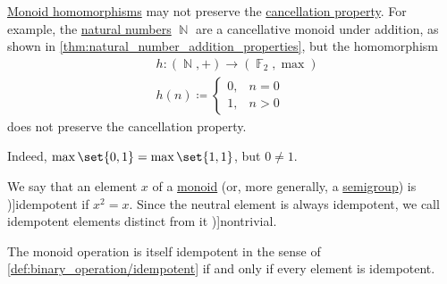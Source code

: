 \begin{example}\label{ex:monoid_cancellation_not_preserved_by_homomorphism}
  \hyperref[def:monoid/morphism]{Monoid homomorphisms} may not preserve the \hyperref[def:binary_operation/cancellative]{cancellation property}. For example, the \hyperref[def:natural_numbers]{natural numbers} \( \BbbN \) are a cancellative monoid under addition, as shown in \cref{thm:natural_number_addition_properties}, but the homomorphism
  \begin{equation*}
    \begin{aligned}
      &h: (\BbbN, +) \to (\BbbF_2, \max) \\
      &h(n) \coloneqq \begin{cases}
        0, &n = 0 \\
        1, &n > 0
      \end{cases}
    \end{aligned}
  \end{equation*}
  does not preserve the cancellation property.

  Indeed, \( \max\set{ 0, 1 } = \max\set{ 1, 1 } \), but \( 0 \neq 1 \).
\end{example}

\begin{definition}\label{def:monoid_idempotent}
  We say that an element \( x \) of a \hyperref[def:monoid]{monoid} (or, more generally, a \hyperref[def:semigroup]{semigroup}) is \term[ru=идемпотент (\cite[72]{Ляпин1960Полугруппы})]{idempotent} if \( x^2 = x \). Since the neutral element is always idempotent, we call idempotent elements distinct from it \term[en=nontrivial (idempotent) (\cite[287]{Rudin1991FunctionalAnalysis})]{nontrivial}.
\end{definition}
\begin{comments}
  \item The monoid operation is itself idempotent in the sense of \cref{def:binary_operation/idempotent} if and only if every element is idempotent.
\end{comments}
